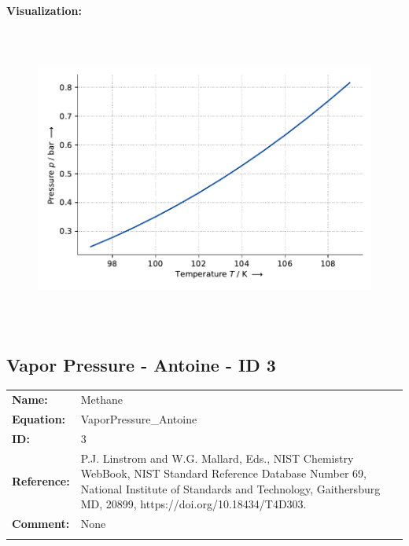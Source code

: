 \textbf{Visualization:}
%
\begin{figure}[!htp]
{\noindent\includegraphics[height=10cm, keepaspectratio]{figs/ref/ref_Methane_VaporPressure_Antoine_2.pdf}}
\end{figure}
%

\FloatBarrier
\newpage
\subsection{Vapor Pressure - Antoine - ID 3}
%
\begin{tabular}[l]{|lp{11.5cm}|}
\hline
\addlinespace

\textbf{Name:} & Methane \\
\textbf{Equation:} & VaporPressure\_Antoine \\
\textbf{ID:} & 3 \\
\textbf{Reference:} & P.J. Linstrom and W.G. Mallard, Eds., NIST Chemistry WebBook, NIST Standard Reference Database Number 69, National Institute of Standards and Technology, Gaithersburg MD, 20899, https://doi.org/10.18434/T4D303. \\
\textbf{Comment:} & None \\

\addlinespace
\hline
\end{tabular}
\newline

